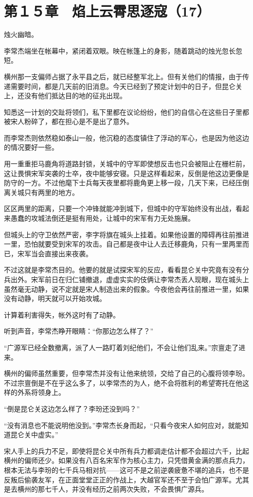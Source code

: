 \section{第１５章　焰上云霄思逐寇（17）}

烛火幽暗。

李常杰端坐在帐幕中，紧闭着双眼。映在帐篷上的身影，随着跳动的烛光忽长忽短。

横州那一支偏师占据了永平县之后，就已经整军北上。但有关他们的情报，由于传递需要时间，都是几天前的旧消息。今天已经到了预定计划中的日子，但昆仑关上，还没有他们抵达目的地的征兆出现。

知悉这一计划的交趾将领们，私下里都在议论纷纷，他们的自信心在这些日子里都被宋人粉碎了，都在担心是不是出了意外。

而李常杰则依然稳如泰山一般，他沉稳的态度镇住了浮动的军心，也是因为他这边的情况要好一些。

用一重重拒马鹿角将道路封锁，关城中的守军即使想反击也只会被阻止在栅栏前，这让畏惧宋军突袭的士卒，夜中能够安寝。只是这样看起来，反倒是他这边更像是防守的一方。不过他麾下士兵每天夜里都将鹿角更上移一段，几天下来，已经压倒离关城只有两里的地方。

区区两里的距离，只要一个冲锋就能冲到城下，但城中的守军始终没有出战，看起来愚蠢的攻城法倒还是挺有用处，让城中的宋军有力无处施展。

但城头上的守卫依然严密，李字将旗在城头上挂着。如果他设置的障碍再往前推进一里，恐怕就要受到宋军的攻击。自己都是夜中让人去迁移鹿角，只有一里两里而已，宋军当会直接出来夜袭。

不过这就是李常杰目的。他要的就是试探宋军的反应，看看昆仑关中究竟有没有分兵出外。宋军前日在归仁铺撤退，虚虚实实的伎俩让李常杰丢人现眼，现在城头上虽然毫无动静，说不定就是宋人制造出来的假象。今夜他会再往前推进一里，如果没有动静，明天就可以开始攻城。

计算着利害得失，帐外这时有了动静。

听到声音，李常杰睁开眼睛：“你那边怎么样了？”

“广源军已经全数撤离，派了人一路盯着刘纪他们，不会让他们乱来。”宗亶走了进来。

横州的偏师虽然重要，但李常杰并没有让他来统领，交给了自己的心腹将领李玢。不过宗亶倒是不在乎这么多了，以李常杰的为人，绝不会将胜利的希望寄托在他这样的外系将领身上。

“倒是昆仑关这边怎么样了？李玢还没到吗？”

“没有消息也不能说明他没到。”李常杰长身而起，“只看今夜宋人如何应对，就能知道昆仑关中虚实。”

宋人手上的兵力不足，即使将昆仑关中所有兵力都调走估计都不会超过六千，比起横州的偏师还少。如果没有八百名宋军作为核心主力，只凭借黄金满的那点兵力，根本无法与李玢的七千兵马相对抗——这可不是之前逆袭疲惫不堪的追兵，也不是反叛后偷袭友军，在正面堂堂正正的作战上，大越官军还不至于会怕广源军。尤其是去横州的那七千人，并没有经历之前两次失败，不会畏惧广源兵。

